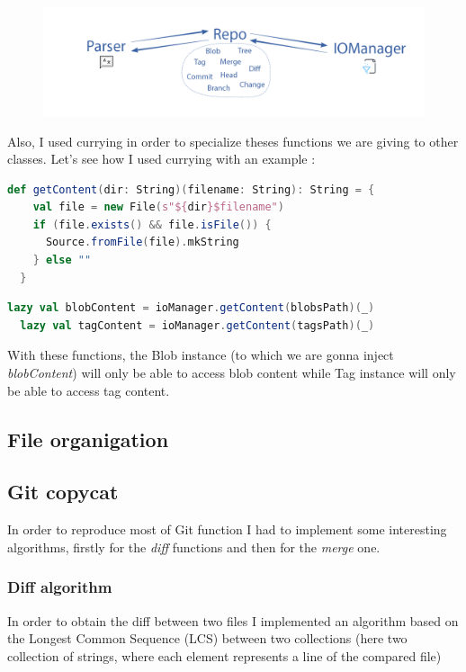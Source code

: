 \documentclass[11pt]{article}
\begin{document}
\begin{figure}[h!]
  \centering
  \includegraphics[width=\linewidth]{img/flowDetailled.png}
\end{figure}

Also, I used currying in order to specialize theses functions we are giving to other classes. Let's see how I used currying with an example :

\begin{lstlisting}[language=scala, caption=Function in IOManager]
  def getContent(dir: String)(filename: String): String = {
    val file = new File(s"${dir}$filename")
    if (file.exists() && file.isFile()) {
      Source.fromFile(file).mkString
    } else ""
  }
\end{lstlisting}

\begin{lstlisting}[language=scala, caption=Functions to be injected]
  lazy val blobContent = ioManager.getContent(blobsPath)(_)
  lazy val tagContent = ioManager.getContent(tagsPath)(_)
\end{lstlisting}

With these functions, the Blob instance (to which we are gonna inject \textit{blobContent}) will only be able to access blob content while Tag instance will only be able to access tag content.

\subsection{File organigation}


\subsection{Git copycat}

In order to reproduce most of Git function I had to implement some interesting algorithms, firstly for the \textit{diff} functions and then for the \textit{merge} one.

\subsubsection{Diff algorithm}
In order to obtain the diff between two files I implemented an algorithm based on the Longest Common Sequence (LCS) between two collections (here two collection of strings, where each element represents a line of the compared file)
\end{document}
